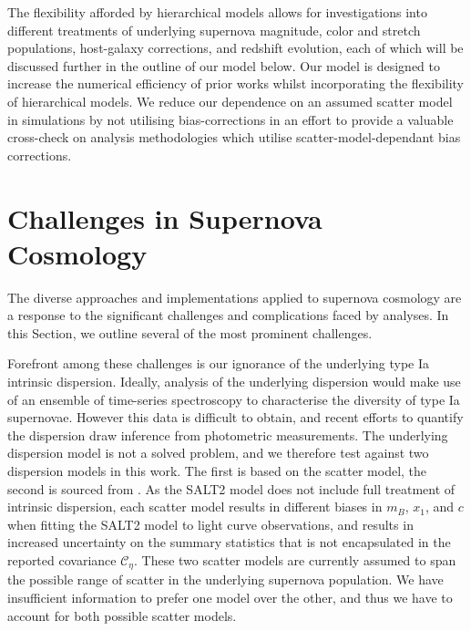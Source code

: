 \documentclass[twocolumn,trackchanges,tighten]{aastex62}
\newcommand{\gten}{\citetalias{Guy2010}}
\newcommand{\celeven}{\citetalias{Chotard2011}}
\begin{document}
The flexibility afforded by hierarchical models allows for investigations into different treatments of underlying supernova magnitude, color and stretch populations, host-galaxy corrections, and redshift evolution, each of which will be discussed further in the outline of our model below. Our model is designed to increase the numerical efficiency of prior works whilst incorporating the flexibility of hierarchical models. We reduce our dependence on an assumed scatter model in simulations by not utilising bias-corrections in an effort to provide a valuable cross-check on analysis methodologies which utilise scatter-model-dependant bias corrections.





\section{Challenges in Supernova Cosmology}
\label{sec:challenges}


 The diverse approaches and implementations applied to supernova cosmology are a response to the significant challenges and complications faced by analyses. In this Section, we outline several of the most prominent challenges. 

 Forefront among these challenges is our ignorance of the underlying type Ia intrinsic dispersion. Ideally, analysis of the underlying dispersion would make use of an ensemble of time-series spectroscopy to characterise the diversity of type Ia supernovae. However this data is difficult to obtain, and recent efforts to quantify the dispersion draw inference from photometric measurements. The underlying dispersion model is not a solved problem, and we therefore test against two dispersion models in this work. The first is based on the \citet[][hereafter denoted {\gten}]{Guy2010} scatter model, the second is sourced from \citet[][hereafter denoted {\celeven}]{Chotard2011}. As the SALT2 model does not include full treatment of intrinsic dispersion, each scatter model results in different biases in $m_B$, $x_1$, and $c$ when fitting the SALT2 model to light curve observations, and results in increased uncertainty on the summary statistics that is not encapsulated in the reported covariance $\mathcal{C_\eta}$. These two scatter models are currently assumed to span the possible range of scatter in the underlying supernova population. We have insufficient information to prefer one model over the other, and thus we have to account for both possible scatter models.
\end{document}
